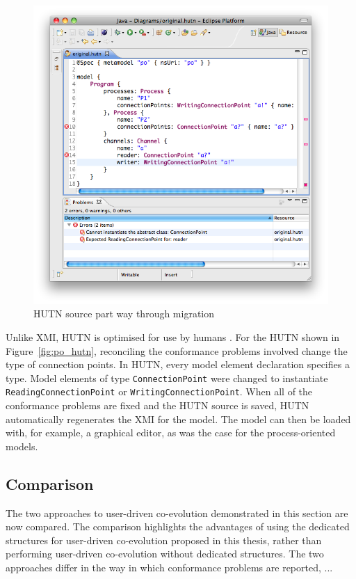 \begin{figure}[htbp]
  \centering
  \includegraphics[width=13.5cm]{6.Evaluation/images/user_driven/po_hutn_partial.png}
  \caption{HUTN source part way through migration}
  \label{fig:po_hutn_partial}
\end{figure}

Unlike XMI, HUTN is optimised for use by humans \cite{hutn}. For the HUTN shown in Figure~\ref{fig:po_hutn}, reconciling the conformance problems involved change the type of connection points. In HUTN, every model element declaration specifies a type. Model elements of type \texttt{ConnectionPoint} were changed to instantiate \texttt{ReadingConnectionPoint} or \texttt{WritingConnectionPoint}. When all of the conformance problems are fixed and the HUTN source is saved, HUTN automatically regenerates the XMI for the model. The model can then be loaded with, for  example, a graphical editor, as was the case for the process-oriented models.


\subsection{Comparison}
\label{subsec:user_driven_example_comparison}
The two approaches to user-driven co-evolution demonstrated in this section are now compared. The comparison highlights the advantages of using the dedicated structures for user-driven co-evolution proposed in this thesis, rather than performing user-driven co-evolution without dedicated structures. The two approaches differ in the way in which conformance problems are reported, ...


